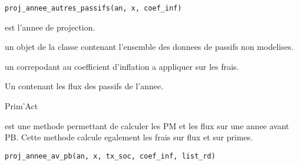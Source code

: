\documentclass[a4paper]{book}
\begin{document}
%
\begin{Usage}
\begin{verbatim}
proj_annee_autres_passifs(an, x, coef_inf)
\end{verbatim}
\end{Usage}
%
\begin{Arguments}
\begin{ldescription}
\item[\code{an}] est l'annee de projection.

\item[\code{x}] un objet de la classe  contenant l'ensemble des donnees de passifs non modelises.

\item[\code{coef\_inf}] un  correpodant au coefficient d'inflation a appliquer sur les frais.
\end{ldescription}
\end{Arguments}
%
\begin{Value}
Un  contenant les flux des passifs de l'annee.
\end{Value}
%
\begin{Author}\relax
Prim'Act
\end{Author}
%
\begin{Description}\relax
{} est une methode permettant de calculer les PM et les flux sur une annee avant PB.
Cette methode calcule egalement les frais sur flux et sur primes.
\end{Description}
%
\begin{Usage}
\begin{verbatim}
proj_annee_av_pb(an, x, tx_soc, coef_inf, list_rd)
\end{verbatim}
\end{Usage}
%
\end{document}
